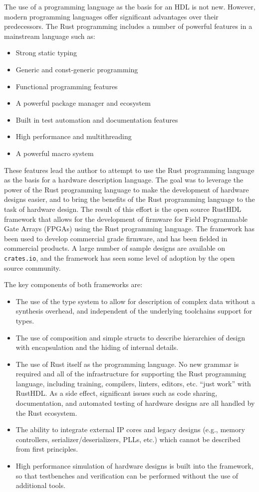 \documentclass[conference]{IEEEtran}
\begin{document}
The use of a programming language as the basis for an HDL is not new.  However, modern programming
languages offer significant advantages over their predecessors.  The Rust programming 
includes a number of powerful features in a mainstream language such as:
\begin{itemize}
  \item Strong static typing
  \item Generic and const-generic programming
  \item Functional programming features
  \item A powerful package manager and ecosystem
  \item Built in test automation and documentation features
  \item High performance and multithreading
  \item A powerful macro system
\end{itemize}
These features lead the author to attempt to use the Rust programming language as the basis for
a hardware description language.  The goal was to leverage the power of the Rust programming language
to make the development of hardware designs easier, and to bring the benefits of the Rust programming
language to the task of hardware design.  The result of this effort is the open source RustHDL 
framework that allows for the development of firmware for Field Programmable Gate Arrays (FPGAs)
using the Rust programming language.  The framework has been used to develop commercial grade
firmware, and has been fielded in commercial products.  A large number of sample designs are
available on \verb|crates.io|, and the framework has seen some level of adoption by the open source
community.

The key components of both frameworks are:
\begin{itemize}
\item The use of the type system to allow for description of complex data without
  a synthesis overhead, and independent of the underlying toolchains support for
  types.
\item The use of composition and simple structs to describe hierarchies of design
  with encapsulation and the hiding of internal details.
\item The use of Rust itself as the programming language.  No new grammar is required
  and all of the infrastructure for supporting the Rust programming language, including training,
  compilers, linters, editors, etc. ``just work'' with RustHDL.  As a side effect,
  significant issues such as code sharing, documentation, and automated testing of hardware designs 
  are all handled by the Rust ecosystem.
\item The ability to integrate external IP cores and legacy designs (e.g., memory controllers,
  serializer/deserializers, PLLs, etc.) which cannot be described from first principles.
\item High performance simulation of hardware designs is built into the framework, so that
  testbenches and verification can be performed without the use of additional tools.
\end{itemize}
\end{document}
